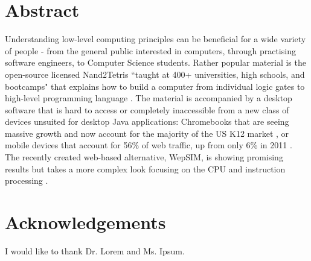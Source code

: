 \setcounter{page}{1}

\chapter*{Abstract}

Understanding low-level computing principles can be beneficial for a wide variety of people - from the general public interested in computers, through practising software engineers, to Computer Science students.
Rather popular material is the open-source licensed Nand2Tetris ``taught at 400+ universities, high schools, and bootcamps" that explains how to build a computer from individual logic gates to high-level programming language \parencite{nand2tetrisweb}.
The material is accompanied by a desktop software that is hard to access or completely inaccessible from a new class of devices unsuited for desktop Java applications: Chromebooks that are seeing massive growth and now account for the majority of the US K12 market \parencite{Boreham_2019} \parencite{IDC_2021}, or mobile devices that account for 56\% of web traffic, up from only 6\% in 2011 \parencite{StatCounter_2021}.
The recently created web-based alternative, WepSIM, is showing promising results but takes a more complex look focusing on the CPU and instruction processing \parencite{garcia2019wepsim}.

\chapter*{Acknowledgements}

I would like to thank Dr. Lorem and Ms. Ipsum.

\tableofcontents

\listoffigures

\listoftables

\cleardoublepage

\setcounter{page}{1}
